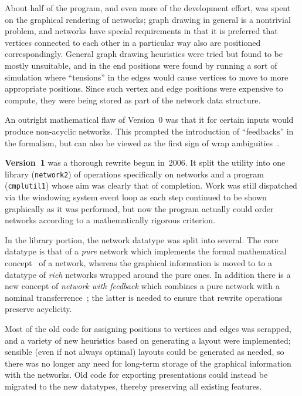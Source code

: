 \documentclass{article}
\theoremstyle{definition}
\begin{document}
About half of the program, and even more of the development effort, 
was spent on the graphical rendering of networks; graph drawing in 
general is a nontrivial problem, and networks have special 
requirements in that it is preferred that vertices connected to each 
other in a particular way also are positioned correspondingly. 
General graph drawing heuristics were tried but found to be mostly 
unsuitable, and in the end positions were found by running a sort of 
simulation where ``tensions'' in the edges would cause vertices to 
move to more appropriate positions. Since such vertex and edge 
positions were expensive to compute, they were being stored as part 
of the network data structure.

An outright mathematical flaw of Version~0 was that it for certain 
inputs would produce non-acyclic networks. This prompted the 
introduction of ``feedbacks'' in the formalism, but can also be 
viewed as the first sign of wrap ambiguities~\cite{LH:IWC}.


\textbf{Version~1} was a thorough rewrite begun in~2006. It split the 
utility into one library (\texttt{network2}) of operations 
specifically on networks and a program (\texttt{cmplutil1}) whose aim 
was clearly that of completion. Work was still dispatched via the 
windowing system event loop as each step continued to be shown 
graphically as it was performed, but now the program actually could 
order networks according to a mathematically rigorous criterion.

In the library portion, the network datatype was split into several. 
The core datatype is that of a \emph{pure} network which implements 
the formal mathematical concept~\cite[Def.~5.1]{NR1} of a network, 
whereas the graphical information is moved to to a datatype of 
\emph{rich} networks wrapped around the pure ones. In addition there 
is a new concept of \emph{network with feedback} which combines a 
pure network with a nominal transferrence~\cite[Def.~6.14]{NR1}; the 
latter is needed to ensure that rewrite operations preserve 
acyclicity.

Most of the old code for assigning positions to vertices and edges 
was scrapped, and a variety of new heuristics based on generating a 
layout were implemented; sensible (even if not always optimal) 
layouts could be generated as needed, so there was no longer any need 
for long-term storage of the graphical information with the networks. 
Old code for exporting presentations could instead be migrated to the 
new datatypes, thereby preserving all existing features.
\end{document}
